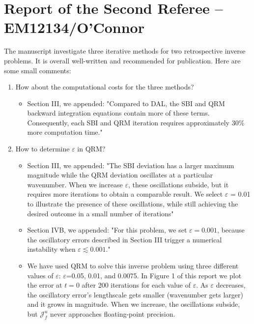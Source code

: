 \documentclass[%
 letter,
 amsmath,amssymb,
]{revtex4-2}
\begin{document}
\section*{Report of the Second Referee -- EM12134/O'Connor}
  
The manuscript investigate three iterative methods for two retrospective inverse problems. It is overall well-written and recommended for publication. Here are some small comments:  

\begin{enumerate}
\item How about the computational costs for the three methods?  \\
\color{blue}
\begin{itemize}
  \item Section III, we appended: "Compared to DAL, the SBI and QRM backward integration equations contain more of these terms. Consequently, each SBI and QRM iteration requires approximately $30\%$ more computation time."\end{itemize}
  
  \color{black}
  \item How to determine $\varepsilon$ in QRM?  \\
  \color{blue}
  \begin{itemize}
  \item Section III, we appended: "The SBI deviation has a larger maximum magnitude while the QRM deviation oscillates at a particular wavenumber. When we increase $\varepsilon$, these oscillations subside, but it requires more iterations to obtain a comparable result. We select $\varepsilon$ = 0.01 to illustrate the presence of these oscillations, while still achieving the desired outcome in a small number of iterations"

  \item Section IVB, we appended: "For this problem, we set $\varepsilon=0.001$, because the oscillatory errors described in Section III trigger a numerical instability when $\varepsilon \lesssim 0.001$."
  
  \item We have used QRM to solve this inverse problem using three different values of $\varepsilon$: $\varepsilon$=0.05, 0.01, and 0.0075. In Figure 1 of this report we plot the error at $t=0$ after 200 iterations for each value of $\varepsilon$. As $\varepsilon$ decreases, the oscillatory error's lengthscale gets smaller (wavenumber gets larger) and it grows in magnitude. When we increase, the oscillations subside, but $\mathcal{J}_f^u$ never approaches floating-point precision.
  

\end{itemize}
\end{enumerate}
\end{document}
